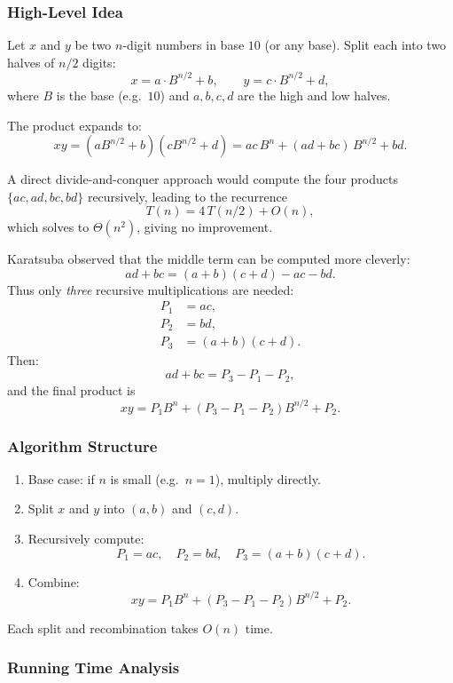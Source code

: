 \documentclass[9pt]{extarticle}
\begin{document}
\subsubsection*{High-Level Idea}

Let $x$ and $y$ be two $n$-digit numbers in base $10$ (or any base).  
Split each into two halves of $n/2$ digits:
\[
    x = a\cdot B^{n/2} + b, \qquad
    y = c\cdot B^{n/2} + d,
\]
where $B$ is the base (e.g.\ $10$) and $a,b,c,d$ are the high and low halves.

The product expands to:
\[
    xy = (aB^{n/2} + b)(cB^{n/2} + d)
       = ac\,B^n + (ad + bc)\,B^{n/2} + bd.
\]

A direct divide-and-conquer approach would compute the four products
$\{ac, ad, bc, bd\}$ recursively, leading to the recurrence
\[
    T(n) = 4\,T(n/2) + O(n),
\]
which solves to $\Theta(n^2)$, giving no improvement.

Karatsuba observed that the middle term can be computed more cleverly:
\[
    ad + bc
    = (a+b)(c+d) - ac - bd.
\]
Thus only \emph{three} recursive multiplications are needed:
\[
\begin{aligned}
    P_1 &= ac, \\
    P_2 &= bd, \\
    P_3 &= (a+b)(c+d).
\end{aligned}
\]
Then:
\[
    ad + bc = P_3 - P_1 - P_2,
\]
and the final product is
\[
    xy = P_1B^n + (P_3 - P_1 - P_2)B^{n/2} + P_2.
\]

\subsubsection*{Algorithm Structure}

\begin{enumerate}
    \item Base case: if $n$ is small (e.g.\ $n=1$), multiply directly.
    \item Split $x$ and $y$ into $(a,b)$ and $(c,d)$.
    \item Recursively compute:
    \[
        P_1 = ac,\quad
        P_2 = bd,\quad
        P_3 = (a+b)(c+d).
    \]
    \item Combine:
    \[
        xy = P_1B^{n} + (P_3 - P_1 - P_2)B^{n/2} + P_2.
    \]
\end{enumerate}

Each split and recombination takes $O(n)$ time.

\subsubsection*{Running Time Analysis}
\end{document}
